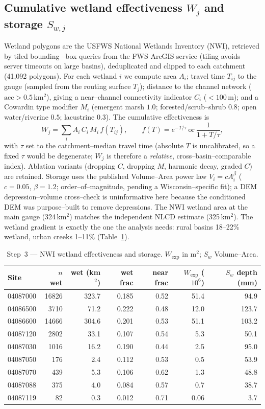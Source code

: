 \documentclass[11pt]{article}
\newcommand{\Wj}{W_{j}}
\newcommand{\Swj}{S_{w,j}}
\begin{document}
\subsection{Cumulative wetland effectiveness $\Wj$ and storage $\Swj$}
Wetland polygons are the USFWS National Wetlands Inventory (NWI), retrieved by tiled bounding
--box queries from the FWS ArcGIS service (tiling avoids server timeouts on large basins),
deduplicated and clipped to each catchment (41{,}092 polygons). For each wetland $i$ we compute
area $A_i$; travel time $T_{ij}$ to the gauge (sampled from the routing surface $T_{j}$);
distance to the channel network ($\mathrm{acc}>0.5$\,km$^2$), giving a near--channel
connectivity indicator $C_i$ ($<100$\,m); and a Cowardin type modifier $M_i$ (emergent marsh
$1.0$; forested/scrub--shrub $0.8$; open water/riverine $0.5$; lacustrine $0.3$). The
cumulative effectiveness is
\begin{equation}
\Wj=\sum_{i} A_i\, C_i\, M_i\, f(T_{ij}), \qquad
f(T)=e^{-T/\tau}\ \text{or}\ \frac{1}{1+T/\tau},
\end{equation}
with $\tau$ set to the catchment--median travel time (absolute $T$ is uncalibrated, so a fixed
$\tau$ would be degenerate; $\Wj$ is therefore a \emph{relative}, cross--basin--comparable
index). Ablation variants (dropping $C$, dropping $M$, harmonic decay, graded $C$) are retained.
Storage uses the published Volume--Area power law $V_i=cA_i^{\beta}$ ($c=0.05$, $\beta=1.2$;
order--of--magnitude, pending a Wisconsin--specific fit); a DEM depression--volume cross--check
is uninformative here because the conditioned DEM was purpose--built to remove depressions.
The NWI wetland area at the main gauge (324\,km$^2$) matches the independent NLCD estimate
(325\,km$^2$). The wetland gradient is exactly the one the analysis needs: rural basins
18--22\% wetland, urban creeks 1--11\% (Table~\ref{tab:wsw}).

\begin{table}[htbp]\centering
\caption{Step~3 --- NWI wetland effectiveness and storage. $W_{\exp}$ in m$^2$; $S_w$ Volume--Area.}
\label{tab:wsw}
\small
\begin{tabular}{lrrrrrr}
\toprule
Site & $n$ wet & wet (km$^2$) & wet frac & near frac & $W_{\exp}$ ($10^6$) & $S_w$ depth (mm) \\
\midrule
04087000 & 16826 & 323.7 & 0.185 & 0.52 & 51.4 & 94.9 \\
04086500 & 3710  & 71.2  & 0.222 & 0.48 & 12.0 & 123.7 \\
04086600 & 14666 & 304.6 & 0.201 & 0.53 & 51.1 & 103.2 \\
04087120 & 2802  & 33.1  & 0.107 & 0.54 & 5.3  & 50.1 \\
04087030 & 1016  & 16.2  & 0.190 & 0.44 & 2.5  & 95.0 \\
04087050 & 176   & 2.4   & 0.112 & 0.53 & 0.5  & 53.9 \\
04087070 & 439   & 5.3   & 0.106 & 0.62 & 1.3  & 48.8 \\
04087088 & 375   & 4.0   & 0.084 & 0.57 & 0.7  & 38.7 \\
04087119 & 82    & 0.3   & 0.012 & 0.71 & 0.06 & 3.7 \\
\bottomrule
\end{tabular}
\end{table}
\end{document}
